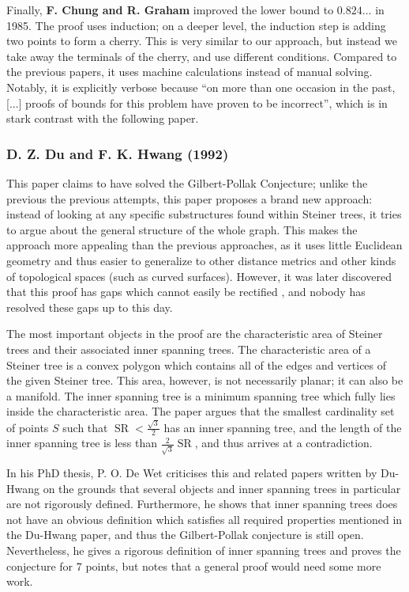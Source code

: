 \documentclass{mpaper}
\begin{document}
Finally, \textbf{F. Chung and R. Graham} \cite{finalb} improved the lower bound to $0.824\dots$ in 1985. The proof uses induction; on a deeper level, the induction step is adding two points to form a cherry.  This is very similar to our approach, but instead we take away the terminals of the cherry, and use different conditions. Compared to the previous papers, it uses machine calculations instead of manual solving. Notably, it is explicitly verbose because ``on more than one occasion in the past, [...] proofs of bounds for this problem have proven to be incorrect'', which is in stark contrast with the following paper.

\subsubsection{D. Z. Du and F. K. Hwang (1992) \cite{doi:10.1073/pnas.87.23.9464}}
This paper claims to have solved the Gilbert-Pollak Conjecture; unlike the previous the previous attempts, this paper proposes a brand new approach: instead of looking at any specific substructures found within Steiner trees, it tries to argue about the general structure of the whole graph. This makes the approach more appealing than the previous approaches, as it uses little Euclidean geometry and thus easier to generalize to other distance metrics and other kinds of topological spaces (such as curved surfaces). However, it was later discovered that this proof has gaps which cannot easily be rectified \cite{Ivanov2012}, and nobody has resolved these gaps up to this day.


The most important objects in the proof are the characteristic area of Steiner trees and their associated inner spanning trees. The characteristic area of a Steiner tree is a convex polygon which contains all of the edges and vertices of the given Steiner tree. This area, however, is not necessarily planar; it can also be a manifold. The inner spanning tree is a minimum spanning tree which fully lies inside the characteristic area. The paper argues that the smallest cardinality set of points $S$ such that $\operatorname{SR}<\frac{\sqrt{3}}{2}$ has an inner spanning tree, and the length of the inner spanning tree is less than $\frac{2}{\sqrt{3}}\operatorname{SR}$, and thus arrives at a contradiction.

In his PhD thesis, P. O. De Wet \cite{po} criticises this and related papers written by Du-Hwang on the grounds that several objects and inner spanning trees in particular are not rigorously defined. Furthermore, he shows that inner spanning trees does not have an obvious definition which satisfies all required properties mentioned in the Du-Hwang paper, and thus the Gilbert-Pollak conjecture is still open. Nevertheless, he gives a rigorous definition of inner spanning trees and proves the conjecture for 7 points, but notes that a general proof would need some more work.
\end{document}

